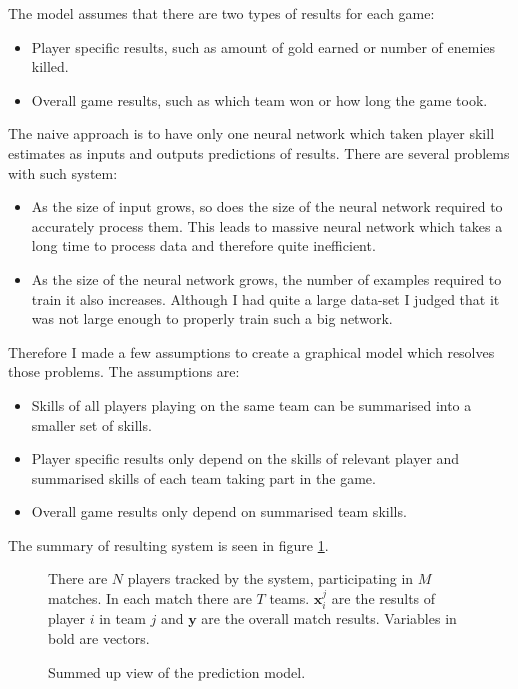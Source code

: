 \documentclass[12pt,a4paper]{book}
\newcommand\bs[1]{\boldsymbol{#1}}
\newcommand\note[1]{\vspace*{-0.5\baselineskip}\caption*{#1}}
\begin{document}
The model assumes that there are two types of results for each game:
\begin{itemize}
\item Player specific results, such as amount of gold earned or number of enemies killed.
\item Overall game results, such as which team won or how long the game took.
\end{itemize}
The naive approach is to have only one neural network which taken player skill estimates as inputs and outputs predictions of results.
There are several problems with such system:
\begin{itemize}
\item As the size of input grows, so does the size of the neural network required to accurately process them.
This leads to massive neural network which takes a long time to process data and therefore quite inefficient.
\item As the size of the neural network grows, the number of examples required to train it also increases.
Although I had quite a large data-set I judged that it was not large enough to properly train such a big network.
\end{itemize}
Therefore I made a few assumptions to create a graphical model which resolves those problems.
The assumptions are:
\begin{itemize}
\item Skills of all players playing on the same team can be summarised into a smaller set of skills.
\item Player specific results only depend on the skills of relevant player and summarised skills of each team taking part in the game.
\item Overall game results only depend on summarised team skills.
\end{itemize}
The summary of resulting system is seen in figure \ref{fig:model-simple}.
\begin{figure}[ht]
\centering
{}
\caption{Summed up view of the prediction model.}
\note{There are $N$ players tracked by the system, participating in $M$ matches.
In each match there are $T$ teams.
$\bs{x}_i^j$ are the results of player $i$ in team $j$ and $\bs{y}$ are the overall match results.
Variables in bold are vectors.}
\label{fig:model-simple}
\end{figure}
\end{document}

